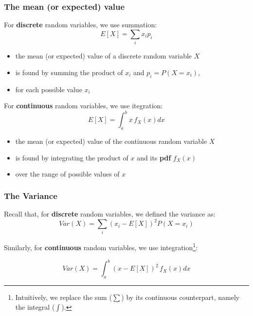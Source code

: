 \documentclass[notes=show,smaller,handout]{beamer}
\renewcommand{\Pr}{P}
\newenvironment{stepitemize}{\begin{itemize}[<+->]}{\end{itemize} }
\begin{document}
\begin{frame}%

\frametitle{The mean (or expected) value}

For \textbf{discrete} random variables, we use summation:%
\begin{equation*}
E\left[ X\right] =\sum_{i}x_{i}p_{i}
\end{equation*}

\begin{stepitemize}
\item the mean (or expected) value of a discrete random variable $X$

\item is found by summing the product of $x_{i}$ and $p_{i}=\Pr (X=x_{i})$,

\item for each possible value $x_{i}$
\end{stepitemize}

\vspace{0.4cm}

For \textbf{continuous} random variables, we use itegration:%
\begin{equation*}
E\left[ X\right] =\int_{a}^{b}x\,f_{X}\left( x\right) dx
\end{equation*}

\begin{stepitemize}
\item the mean (or expected) value of the continuous random variable $X$

\item is found by integrating the product of $x$ and its \textbf{pdf }$%
f_{X}\left( x\right) $

\item over the range of possible values of $x$
\end{stepitemize}

\end{frame}%

\begin{frame}%
\frametitle{The Variance}

Recall that, for \textbf{discrete} random variables, we defined the variance as: \vspace{0.5cm}
\begin{equation*}
Var\left( X\right) =\sum_{i}\left( x_{i}-E\left[ X\right] \right) ^{2}\Pr
\left( X=x_{i}\right)
\end{equation*}

\vspace{1cm}

Similarly, for \textbf{continuous} random variables, we use integration\footnote{Intuitively, we replace the sum ($\sum$) by its continuous counterpart, namely the integral ($\int$). }:
\vspace{0.5cm}

\begin{equation*}
Var\left( X\right) =\int_{a}^{b}\left( x-E\left[ X\right] \right)
^{2}\,f_{X}\left( x\right) dx
\end{equation*}

\end{frame}%
\end{document}
